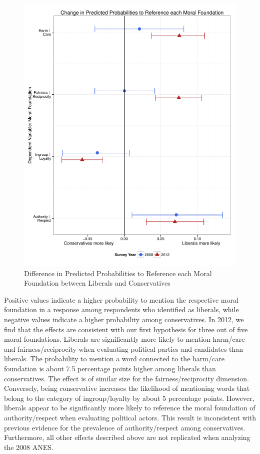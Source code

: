 \documentclass[12pt]{article}
\begin{document}
\begin{figure}\centering
\includegraphics[scale=.4]{../calc/fig/m1_mft.pdf}
\caption{Difference in Predicted Probabilities to Reference each Moral Foundation between Liberals and Conservatives}\label{fig:m1_mft}
\end{figure}

Positive values indicate a higher probability to mention the respective moral foundation in a response among respondents who identified as liberals, while negative values indicate a higher probability among conservatives. In 2012, we find that the effects are consistent with our first hypothesis for three out of five moral foundations. Liberals are significantly more likely to mention harm/care and fairness/reciprocity when evaluating political parties and candidates than liberals. The probability to mention a word connected to the harm/care foundation is about 7.5 percentage points higher among liberals than conservatives. The effect is of similar size for the fairness/reciprocity dimension. Conversely, being conservative increases the likelihood of mentioning words that belong to the category of ingroup/loyalty by about 5 percentage points. However, liberals appear to be significantly more likely to reference the moral foundation of authority/respect when evaluating political actors. This result is inconsistent with previous evidence for the prevalence of authority/respect among conservatives. Furthermore, all other effects described above are not replicated when analyzing the 2008 ANES.
\end{document}
